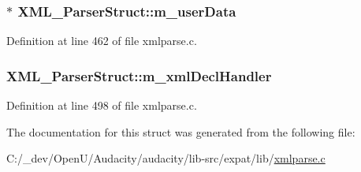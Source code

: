 \subsubsection[{\texorpdfstring{m\+\_\+user\+Data}{m_userData}}]{$\ast$ X\+M\+L\+\_\+\+Parser\+Struct\+::m\+\_\+user\+Data}\hypertarget{struct_x_m_l___parser_struct_a4e98dbfd4821f83314dbf98143d9df7d}{}\label{struct_x_m_l___parser_struct_a4e98dbfd4821f83314dbf98143d9df7d}


Definition at line 462 of file xmlparse.\+c.

\subsubsection[{\texorpdfstring{m\+\_\+xml\+Decl\+Handler}{m_xmlDeclHandler}}]{ X\+M\+L\+\_\+\+Parser\+Struct\+::m\+\_\+xml\+Decl\+Handler}\hypertarget{struct_x_m_l___parser_struct_a0824e03c163d0dbb8c093c478083ad2c}{}\label{struct_x_m_l___parser_struct_a0824e03c163d0dbb8c093c478083ad2c}


Definition at line 498 of file xmlparse.\+c.



The documentation for this struct was generated from the following file\+:\begin{DoxyCompactItemize}
\item 
C\+:/\+\_\+dev/\+Open\+U/\+Audacity/audacity/lib-\/src/expat/lib/\hyperlink{xmlparse_8c}{xmlparse.\+c}\end{DoxyCompactItemize}
